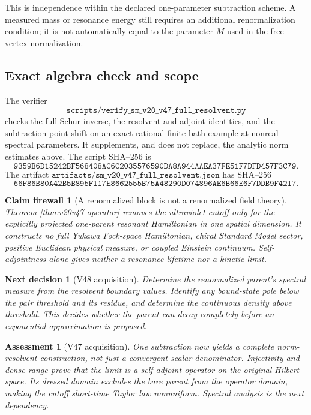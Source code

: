 \documentclass[11pt]{article}
\newtheorem{firewall}[theorem]{Claim firewall}
\newtheorem{decision}[theorem]{Next decision}
\newtheorem{assessment}[theorem]{Assessment}
\theoremstyle{remark}
\begin{document}
This is independence within the declared one-parameter subtraction
scheme.  A measured mass or resonance energy still requires an
additional renormalization condition; it is not automatically equal
to the parameter \(M\) used in the free vertex normalization.

\subsection{Exact algebra check and scope}

The verifier
\[
 \texttt{scripts/verify\_sm\_v20\_v47\_full\_resolvent.py}
\]
checks the full Schur inverse, the resolvent and adjoint identities,
and the subtraction-point shift on an exact rational finite-bath
example at nonreal spectral parameters.  It supplements, and does
not replace, the analytic norm estimates above.
The script SHA--256 is
\[
\texttt{9359B6D15242BF568408AC6C2035576590DA8A944AAEA37FE51F7DFD457F3C79}.
\]
The artifact
\(\texttt{artifacts/sm\_v20\_v47\_full\_resolvent.json}\)
has SHA--256
\[
\texttt{66F86B80A42B5B895F117E8662555B75A48290D074896AE6B66E6F7DDB9F4217}.
\]

\begin{firewall}[A renormalized block is not a renormalized field theory]
\label{fire:v20v47}
Theorem \ref{thm:v20v47-operator} removes the ultraviolet cutoff
only for the explicitly projected one-parent resonant Hamiltonian
in one spatial dimension.  It constructs no full Yukawa Fock-space
Hamiltonian, chiral Standard Model sector, positive Euclidean
physical measure, or coupled Einstein continuum.  Self-adjointness
alone gives neither a resonance lifetime nor a kinetic limit.
\end{firewall}

\begin{decision}[V48 acquisition]
\label{dec:v20v47-next}
Determine the renormalized parent's spectral measure from the
resolvent boundary values.  Identify any bound-state pole below
the pair threshold and its residue, and determine the continuous
density above threshold.  This decides whether the parent can
decay completely before an exponential approximation is proposed.
\end{decision}

\begin{assessment}[V47 acquisition]
\label{ass:v20v47}
One subtraction now yields a complete norm-resolvent construction,
not just a convergent scalar denominator.  Injectivity and dense
range prove that the limit is a self-adjoint operator on the
original Hilbert space.  Its dressed domain excludes the bare
parent from the operator domain, making the cutoff short-time
Taylor law nonuniform.  Spectral analysis is the next dependency.
\end{assessment}
\end{document}
